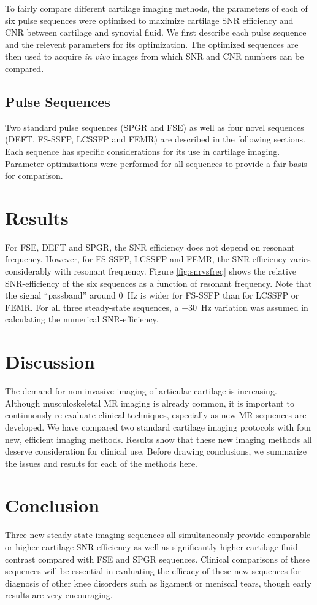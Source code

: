 To fairly compare different cartilage imaging methods,
the parameters of each of six pulse sequences were optimized
to maximize cartilage SNR efficiency and CNR between cartilage
and synovial fluid.  We first describe each pulse sequence and
the relevent parameters for its optimization.  The optimized
sequences are then used to acquire {\em in vivo} images from 
which SNR and CNR numbers can be compared.


\subsection*{Pulse Sequences}

Two standard pulse sequences (SPGR and FSE) as well as 
four novel sequences (DEFT, FS-SSFP, LCSSFP and FEMR) are
described in the following sections.  Each sequence has 
specific considerations for its use in cartilage imaging.
Parameter optimizations were performed for all 
sequences to provide a fair basis for comparison.

\section*{Results}


For FSE, DEFT and SPGR, the SNR efficiency 
does not depend on resonant frequency.  
However, for FS-SSFP, LCSSFP and FEMR, the SNR-efficiency
varies considerably with resonant frequency.  
Figure \ref{fig:snrvsfreq} shows the relative SNR-efficiency
of the six sequences as a function of resonant frequency.
Note that the signal ``passband'' around 0~Hz is wider for
FS-SSFP than for LCSSFP or FEMR.  For all three steady-state
sequences, a $\pm 30$~Hz variation was assumed in calculating
the numerical SNR-efficiency.


\section*{Discussion}

The demand for non-invasive imaging of articular
cartilage is increasing.  
Although musculoskeletal MR imaging is already
common, it is important to continuously re-evaluate 
clinical techniques, especially as new MR sequences
are developed.  We have compared two standard cartilage
imaging protocols with four new, efficient imaging methods.
Results show that these new imaging methods all deserve
consideration for clinical use.  Before drawing conclusions,
we summarize the issues and results for each of the methods
here.


\section*{Conclusion}

Three new steady-state imaging sequences all simultaneously 
provide comparable or higher cartilage SNR efficiency 
as well as significantly higher cartilage-fluid contrast 
compared with FSE and SPGR sequences.  
Clinical comparisons of these sequences will be 
essential in evaluating the efficacy of these new sequences 
for diagnosis of other knee disorders such as ligament or
meniscal tears, though early results are very encouraging.



